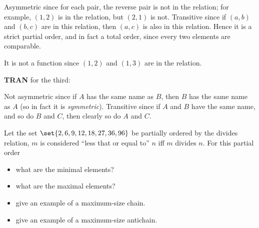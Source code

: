 \documentclass[quiz]{mcs}
\begin{document}
\begin{problem}[3]
{%

Asymmetric since for each pair, the reverse pair is not in the
relation; for example, $(1,2)$ is in the relation, but $(2,1)$ is
not. Transitive since if $(a,b)$ and $(b,c)$ are in this
relation, then $(a,c)$ is also in this relation.  Hence it is a
strict partial order, and in fact a total order, since every two
elements are comparable.

It is not a function since $(1,2)$ and $(1,3)$ are in the
relation.

\textbf{TRAN} for the third:

Not asymmetric since if $A$ has the same name as $B$, then $B$
has the same name as $A$ (so in fact it is \emph{symmetric}).
Transitive since if $A$ and $B$ have the same name, and so do $B$
and $C$, then clearly so do $A$ and $C$. }
\end{problem}




\begin{problem}[2]
Let the set $\set{2,6,9,12,18,27,36,96}$ be \iffalse
(weakly)\fi partially ordered by
the divides relation, $m$ is considered ``less that or equal to'' $n$ iff
$m$ divides $n$.  For this partial order

\begin{itemize}

\item what are the minimal elements? \hfill\brule{1.5in}


\item what are the maximal elements? \hfill\brule{1.5in}


\item give an example of a maximum-size chain. \hfill\brule{1.5in}


\item give an example of a maximum-size antichain. \hfill\brule{1.5in}


\end{itemize}

\end{problem}
\end{document}
